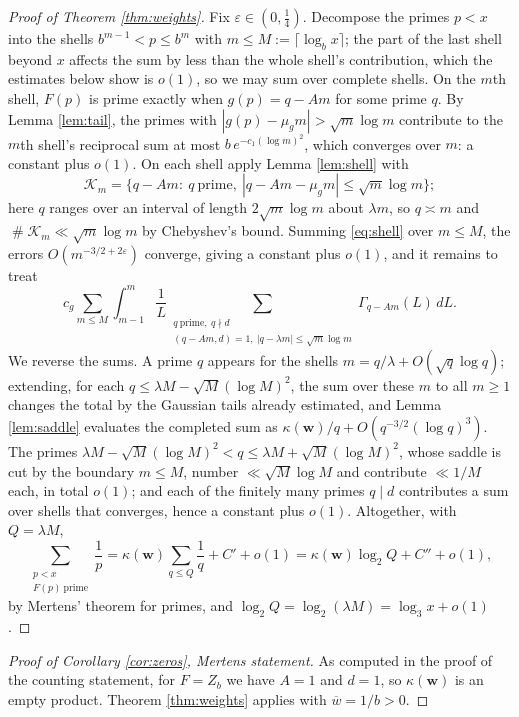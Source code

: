 \documentclass[11pt,reqno]{amsart}
\theoremstyle{plain}
\theoremstyle{definition}
\DeclareMathOperator{\Card}{\#}
\begin{document}
\begin{proof}[Proof of Theorem \ref{thm:weights}]
Fix $\varepsilon\in(0,\tfrac14)$. Decompose the primes $p<x$ into the shells $b^{m-1}<p\le b^{m}$ with $m\le M:=\lceil\log_bx\rceil$; the part of the last shell beyond $x$ affects the sum by less than the whole shell's contribution, which the estimates below show is $o(1)$, so we may sum over complete shells. On the $m$th shell, $F(p)$ is prime exactly when $g(p)=q-Am$ for some prime $q$. By Lemma \ref{lem:tail}, the primes with $|g(p)-\mu_gm|>\sqrt m\log m$ contribute to the $m$th shell's reciprocal sum at most $b\,e^{-c_1(\log m)^{2}}$, which converges over $m$: a constant plus $o(1)$. On each shell apply Lemma \ref{lem:shell} with
\[
\mathcal K_m=\{q-Am:\ q\ \text{prime},\ |q-Am-\mu_gm|\le\sqrt m\log m\};
\]
here $q$ ranges over an interval of length $2\sqrt m\log m$ about $\lambda m$, so $q\asymp m$ and $\Card\mathcal K_m\ll\sqrt m\log m$ by Chebyshev's bound. Summing \eqref{eq:shell} over $m\le M$, the errors $O(m^{-3/2+2\varepsilon})$ converge, giving a constant plus $o(1)$, and it remains to treat
\[
c_g\sum_{m\le M}\int_{m-1}^{m}\frac1L\sum_{\substack{q\ \text{prime},\ q\nmid d\\ (q-Am,d)=1,\ |q-\lambda m|\le\sqrt m\log m}}\Gamma_{q-Am}(L)\,dL .
\]
We reverse the sums. A prime $q$ appears for the shells $m=q/\lambda+O(\sqrt q\log q)$; extending, for each $q\le\lambda M-\sqrt M(\log M)^2$, the sum over these $m$ to all $m\ge1$ changes the total by the Gaussian tails already estimated, and Lemma \ref{lem:saddle} evaluates the completed sum as $\kappa(\mathbf w)/q+O(q^{-3/2}(\log q)^{3})$. The primes $\lambda M-\sqrt M(\log M)^{2}<q\le\lambda M+\sqrt M(\log M)^{2}$, whose saddle is cut by the boundary $m\le M$, number $\ll\sqrt M\log M$ and contribute $\ll1/M$ each, in total $o(1)$; and each of the finitely many primes $q\mid d$ contributes a sum over shells that converges, hence a constant plus $o(1)$. Altogether, with $Q=\lambda M$,
\[
\sum_{\substack{p<x\\ F(p)\ \text{prime}}}\frac1p
=\kappa(\mathbf w)\sum_{q\le Q}\frac1q+C'+o(1)
=\kappa(\mathbf w)\log_2Q+C''+o(1),
\]
by Mertens' theorem for primes, and $\log_2Q=\log_2(\lambda M)=\log_3x+o(1)$.
\end{proof}

\begin{proof}[Proof of Corollary \ref{cor:zeros}, Mertens statement]
As computed in the proof of the counting statement, for $F=Z_b$ we have $A=1$ and $d=1$, so $\kappa(\mathbf w)$ is an empty product. Theorem \ref{thm:weights} applies with $\overline w=1/b>0$.
\end{proof}
\end{document}
